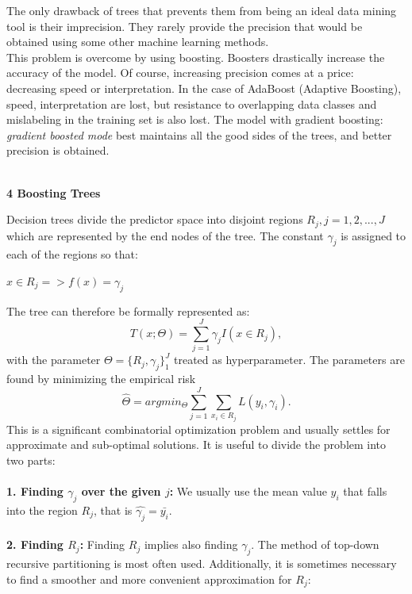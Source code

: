 \documentclass[12pt, letterpaper, twoside]{article}
\begin{document}
\hspace*{4ex}The only drawback of trees that prevents them from being an ideal data mining tool is their imprecision. They rarely provide the precision that would be obtained using some other machine learning methods.\\
\hspace*{4ex}This problem is overcome by using boosting. Boosters drastically increase the accuracy of the model. Of course, increasing precision comes at a price: decreasing speed or interpretation. In the case of AdaBoost (Adaptive Boosting), speed, interpretation are lost, but resistance to overlapping data classes and mislabeling in the training set is also lost. The model with gradient boosting: \emph{gradient boosted mode} best maintains all the good sides of the trees, and better precision is obtained.
\begin{center}
\textbf{\large{\\4 Boosting Trees}\\}
\end{center}
\hspace*{4ex}Decision trees divide the predictor space into disjoint regions $R_j , j = 1, 2, ..., J$ which are represented by the end nodes of the tree. The constant $\gamma_j$ is assigned to each of the regions so that:
\begin{center}
$x\in R_j => f(x)=\gamma_j$
\end{center}
The tree can therefore be formally represented as:
\begin{equation*}
T(x;\Theta)=\sum_{j=1}^J\gamma_jI(x \in R_j),
\end{equation*}
with the parameter $\Theta=\{R_j,\gamma_j\}_1^J$ treated as hyperparameter. The parameters are found by minimizing the empirical risk
\begin{equation*}
\hat{\Theta}=argmin_{\Theta}\sum_{j=1}^J\sum_{x_i \in R_j}L(y_i,\gamma_i).
\end{equation*}
This is a significant combinatorial optimization problem and usually settles for approximate and sub-optimal solutions. It is useful to divide the problem into two parts:\\
\textbf{\\1. Finding $\gamma_j$ over the given $j$:} We usually use the mean value $y_i$ that falls into the region $R_j$, that is $\hat{\gamma_j}=\bar{y_i}$.\\
\textbf{\\2. Finding $R_j$:} Finding $R_j$ implies also finding $\gamma_j$. The method of top-down recursive partitioning is most often used. Additionally, it is sometimes necessary to find a smoother and more convenient approximation for $R_j$: 
\end{document}
